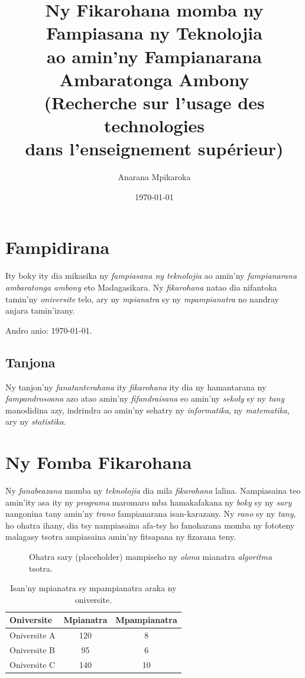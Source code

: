 \documentclass[12pt]{report}
\title{Ny Fikarohana momba ny Fampiasana ny Teknolojia \\
  ao amin'ny Fampianarana Ambaratonga Ambony \\
  \large (Recherche sur l'usage des technologies \\
  dans l'enseignement supérieur)}
\author{Anarana Mpikaroka}
\date{\today}
\begin{document}

\maketitle

\tableofcontents
\listoffigures
\listoftables

\chapter{Fampidirana}

Ity boky ity dia mikasika ny \emph{fampiasana ny teknolojia} ao
amin'ny \emph{fampianarana ambaratonga ambony} eto Madagasikara.
Ny \emph{fikarohana} natao dia nifantoka tamin'ny \emph{oniversite}
telo, ary ny \emph{mpianatra} sy ny \emph{mpampianatra} no
nandray anjara tamin'izany.

Andro anio: \today.

\section{Tanjona}

Ny tanjon'ny \emph{fanatanterahana} ity \emph{fikarohana} ity dia
ny hamantarana ny \emph{fampandrosoana} azo atao amin'ny
\emph{fifandraisana} eo amin'ny \emph{sekoly} sy ny \emph{tany}
manodidina azy, indrindra ao amin'ny sehatry ny
\emph{informatika}, ny \emph{matematika}, ary ny
\emph{statistika}.

\chapter{Ny Fomba Fikarohana}

Ny \emph{fanabeazana} momba ny \emph{teknolojia} dia mila
\emph{fikarohana} lalina. Nampiasaina teo amin'ity asa ity ny
\emph{programa} maromaro mba hamakafakana ny \emph{boky} sy ny
\emph{sary} nangonina tany amin'ny \emph{trano} fampianarana
isan-karazany. Ny \emph{rano} sy ny \emph{tany}, ho ohatra ihany,
dia tsy nampiasaina afa-tsy ho fanoharana momba ny fototeny
malagasy tsotra ampiasaina amin'ny fitsapana ny fizarana teny.

\begin{figure}[h]
  \centering
  \fbox{\rule{0pt}{3cm}\rule{6cm}{0pt}}
  \caption{Ohatra sary (placeholder) mampiseho ny \emph{olona}
    mianatra \emph{algoritma} tsotra.}
\end{figure}

\begin{table}[h]
  \centering
  \begin{tabular}{lcc}
    \toprule
    Oniversite & Mpianatra & Mpampianatra \\
    \midrule
    Oniversite A & 120 & 8 \\
    Oniversite B & 95  & 6 \\
    Oniversite C & 140 & 10 \\
    \bottomrule
  \end{tabular}
  \caption{Isan'ny mpianatra sy mpampianatra araka ny oniversite.}
\end{table}
\end{document}
